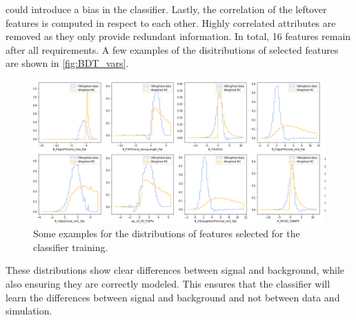 could introduce a bias in the classifier. Lastly, the correlation of the leftover features is computed in respect to each other. Highly correlated attributes are removed as they
only provide redundant information. In total, 16 features remain after all requirements.
A few examples of the disitributions of selected features are shown in \autoref{fig:BDT_vars}.
\begin{figure}[H]
	\centering
	\includegraphics[width=0.8\linewidth]{plots/BDT_variables.png}
	\caption{Some examples for the distributions of features selected for the classifier training.}
	\label{fig:BDT_vars}
\end{figure}
These distributions show clear differences between signal and background, while also ensuring they are correctly modeled. This ensures that the classifier will learn the
differences between signal and background and not between data and simulation.

